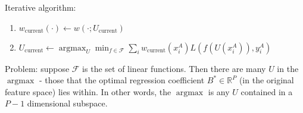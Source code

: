 \documentclass[8pt]{article}
\begin{document}
\noindent Iterative algorithm:
\begin{enumerate}
\item$w_{\operatorname{current}}(\cdot) \leftarrow w(\cdot;
U_{\operatorname{current}})$
\item $U_{\operatorname{current}} \leftarrow \operatorname{argmax}_{U} \min_{f \in
  \mathcal{F}}\sum_i w_{\operatorname{current}}(x_i^A)L(f(U(x_i^A)),y_i^A)$
\end{enumerate}
Problem: suppose $\mathcal{F}$ is the set of linear functions.  Then
there are many $U$ in the $\operatorname{argmax}$ - those that the
optimal regression coefficient $B^*\in \mathbb{R}^P$ (in the original
feature space) lies within.  In other words, the
$\operatorname{argmax}$ is any $U$ contained in a $P-1$ dimensional subspace.













\end{document}
